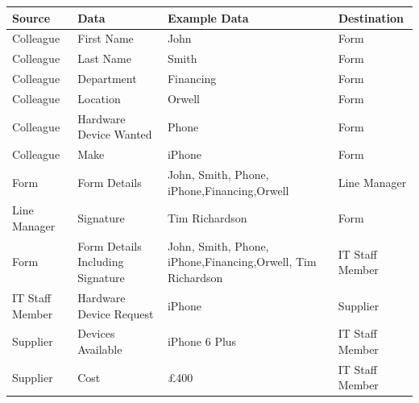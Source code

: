 \begin{center}
\begin{tabular}{|p{3cm}|p{3cm}|p{4cm}|p{3cm}|}
\hline
\textbf{Source} & \textbf{Data} & \textbf{Example Data}      & \textbf{Destination} \\ \hline
Colleague                             & First Name                         & John                                               & Form                                      \\ \hline
Colleague                             & Last Name                          & Smith                                              & Form                                      \\ \hline
Colleague                             & Department                              & Financing                                            & Form                                      \\ \hline
Colleague                             & Location                              & Orwell                                            & Form                                      \\ \hline
Colleague                             & Hardware Device Wanted             & Phone                                              & Form                                      \\ \hline
Colleague                             & Make                               & iPhone                                             & Form                                      \\ \hline
Form                                  & Form Details                       & John, Smith, Phone, iPhone,Financing,Orwell                 & Line Manager                              \\ \hline
Line Manager                          & Signature                          & Tim Richardson                                     & Form                                      \\ \hline
Form                                  & Form Details Including Signature   & John, Smith, Phone, iPhone,Financing,Orwell, Tim Richardson & IT Staff Member                           \\ \hline
IT Staff Member 	&Hardware Device Request & iPhone & Supplier 												\\ \hline
Supplier & Devices Available & iPhone 6 Plus & IT Staff Member \\ \hline
Supplier & Cost & £400 &IT Staff Member \\ \hline

\end{tabular}
\end{center}
